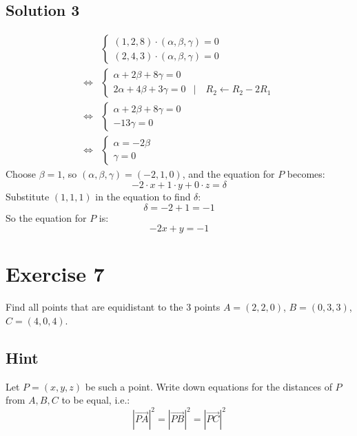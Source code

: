 \documentclass[a4paper,10pt]{article}
\begin{document}
\subsection{Solution 3}
\begin{align*}
         & \begin{cases}
               (1, 2, 8) \cdot (\alpha, \beta, \gamma) = 0 \\
               (2, 4, 3) \cdot (\alpha, \beta, \gamma) = 0
           \end{cases}                         \\
    \iff & \begin{cases}
               \alpha + 2\beta +8\gamma = 0                                        \\
               2\alpha + 4\beta + 3\gamma = 0 & | \quad R_2 \leftarrow R_2 - 2 R_1
           \end{cases} \\
    \iff & \begin{cases}
               \alpha + 2\beta +8\gamma = 0 \\
               -13\gamma = 0
           \end{cases}
    \\ \iff & \begin{cases}
        \alpha = -2\beta \\
        \gamma = 0
    \end{cases}
\end{align*}
Choose $\beta = 1$, so $(\alpha, \beta, \gamma) = (-2, 1, 0)$, and the equation for $P$ becomes:
\[
    -2\cdot x + 1\cdot y + 0\cdot z = \delta
\]
Substitute $(1, 1, 1)$ in the equation to find $\delta$:
\[
    \delta = -2 + 1 = -1
\]
So the equation for $P$ is:
\[
    -2x+y=-1
\]

\clearpage

\section{Exercise 7}

Find all points that are equidistant to the 3 points $A = (2, 2, 0)$, $B = (0, 3, 3)$, $C = (4, 0, 4)$.

\subsection{Hint}
Let $P=(x,y,z)$ be such a point. Write down equations for the distances of $P$ from $A,B,C$ to be equal, i.e.:
\[
    \left|\overrightarrow{PA}\right|^2 = \left|\overrightarrow{PB}\right|^2 = \left|\overrightarrow{PC}\right|^2
\]
\end{document}
